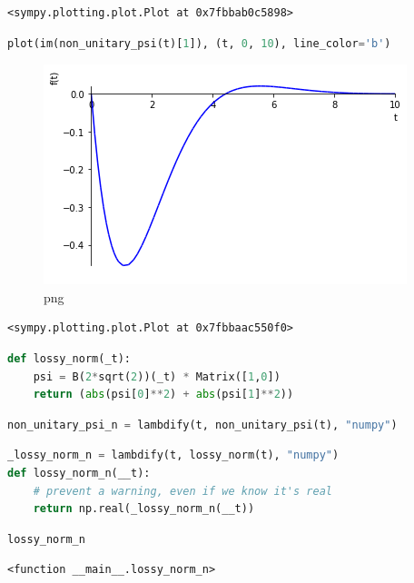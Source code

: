 \begin{lstlisting}
<sympy.plotting.plot.Plot at 0x7fbbab0c5898>
\end{lstlisting}

\begin{lstlisting}[language=Python]
plot(im(non_unitary_psi(t)[1]), (t, 0, 10), line_color='b')
\end{lstlisting}

\begin{figure}
\centering
\includegraphics[width=0.66\linewidth]{output_21_0.png}
\caption{png}
\end{figure}

\begin{lstlisting}
<sympy.plotting.plot.Plot at 0x7fbbaac550f0>
\end{lstlisting}

\begin{lstlisting}[language=Python]
def lossy_norm(_t):
    psi = B(2*sqrt(2))(_t) * Matrix([1,0])
    return (abs(psi[0]**2) + abs(psi[1]**2))
\end{lstlisting}

\begin{lstlisting}[language=Python]
non_unitary_psi_n = lambdify(t, non_unitary_psi(t), "numpy")
\end{lstlisting}

\begin{lstlisting}[language=Python]
_lossy_norm_n = lambdify(t, lossy_norm(t), "numpy")
def lossy_norm_n(__t):
    # prevent a warning, even if we know it's real
    return np.real(_lossy_norm_n(__t))
\end{lstlisting}

\begin{lstlisting}[language=Python]
lossy_norm_n
\end{lstlisting}

\begin{lstlisting}
<function __main__.lossy_norm_n>
\end{lstlisting}

